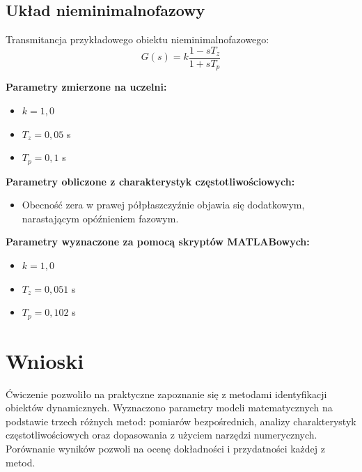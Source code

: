 \documentclass[12pt,a4paper]{article}
\begin{document}
	\subsection{Układ nieminimalnofazowy}
	Transmitancja przykładowego obiektu nieminimalnofazowego:
	\begin{equation}
		G(s) = k \frac{1-sT_z}{1+sT_p}
	\end{equation}
	
	\noindent \textbf{Parametry zmierzone na uczelni:}
	\begin{itemize}
		\item $k = 1{,}0$ %
		\item $T_z = 0{,}05$ s %
		\item $T_p = 0{,}1$ s %
	\end{itemize}
	
	\noindent \textbf{Parametry obliczone z charakterystyk częstotliwościowych:}
	\begin{itemize}
		\item Obecność zera w prawej półpłaszczyźnie objawia się dodatkowym, narastającym opóźnieniem fazowym.
	\end{itemize}
	
	\noindent \textbf{Parametry wyznaczone za pomocą skryptów MATLABowych:}
	\begin{itemize}
		\item $k = 1{,}0$ %
		\item $T_z = 0{,}051$ s %
		\item $T_p = 0{,}102$ s %
	\end{itemize}
	
	\section{Wnioski}
	Ćwiczenie pozwoliło na praktyczne zapoznanie się z metodami identyfikacji obiektów dynamicznych. Wyznaczono parametry modeli matematycznych na podstawie trzech różnych metod: pomiarów bezpośrednich, analizy charakterystyk częstotliwościowych oraz dopasowania z użyciem narzędzi numerycznych. Porównanie wyników pozwoli na ocenę dokładności i przydatności każdej z metod.
	
\end{document}
